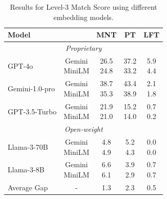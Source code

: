 \begin{table}[tp]
\small
\centering
\caption{Results for Level-3 Match Score using different embedding models.}
\begin{tabular}{l|c|ccc}
\toprule
\multicolumn{2}{l|}{Model} & \multicolumn{1}{c|}{MNT} & \multicolumn{1}{c|}{PT} &  \multicolumn{1}{c}{LFT}  \\
\midrule
\multicolumn{5}{c}{\textit{Proprietary}} \\
\midrule
GPT-4o & \makecell{Gemini \\ MiniLM} & 
\makecell{26.5 \\ 24.8} & \makecell{37.2 \\ 33.2} & \makecell{5.9 \\ 4.4} \\
\midrule
Gemini-1.0-pro & \makecell{Gemini \\ MiniLM} & 
\makecell{38.7 \\ 35.3} & \makecell{43.4 \\ 38.9} & \makecell{2.1 \\ 1.8} \\
\midrule
GPT-3.5-Turbo & \makecell{Gemini \\ MiniLM} & 
\makecell{21.9 \\ 21.0} & \makecell{15.2 \\ 14.0} & \makecell{0.7 \\ 0.2} \\
\midrule
\multicolumn{5}{c}{\textit{Open-weight}} \\
\midrule
Llama-3-70B & \makecell{Gemini \\ MiniLM} & 
\makecell{4.8 \\ 4.9} & \makecell{5.2 \\ 4.3} & \makecell{0.0 \\ 0.0} \\
\midrule
Llama-3-8B & \makecell{Gemini \\ MiniLM} & 
\makecell{6.6 \\ 6.1} & \makecell{3.9 \\ 2.9} & \makecell{0.7 \\ 0.7} \\
\midrule
Average Gap & - & 
1.3 & 2.3 & 0.5 \\
\bottomrule
\end{tabular}
\label{tab:embedding_gap}
\end{table}